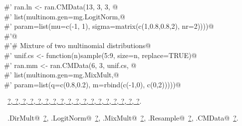 \documentclass[reqno]{amsart}
\renewcommand{\NWlink}[2]{\hyperlink{#1}{#2}}
\begin{document}
\begin{flushleft}
\begin{list}{}{}
\mbox{}\verb@#' ran.ln <- ran.CMData(13, 3, 3, @\\
\mbox{}\verb@#'                      list(multinom.gen=mg.LogitNorm,@\\
\mbox{}\verb@#'                           param=list(mu=c(-1, 1), sigma=matrix(c(1,0.8,0.8,2), nr=2))))@\\
\mbox{}\verb@#'@\\
\mbox{}\verb@#'# Mixture of two multinomial distributions@\\
\mbox{}\verb@#' unif.cs <- function(n){sample(5:9, size=n, replace=TRUE)}@\\
\mbox{}\verb@#' ran.mm <- ran.CMData(6, 3, unif.cs, @\\
\mbox{}\verb@#'                      list(multinom.gen=mg.MixMult,@\\
\mbox{}\verb@#'                           param=list(q=c(0.8,0.2), m=rbind(c(-1,0), c(0,2)))))@\\
\mbox{}\verb@@{\NWsep}
\end{list}
\vspace{-1.5ex}
\footnotesize
\begin{list}{}{\setlength{\itemsep}{-\parsep}\setlength{\itemindent}{-\leftmargin}}
\item \NWtxtFileDefBy\ \NWlink{nuweb?}{?}\NWlink{nuweb?}{, ?}\NWlink{nuweb?}{, ?}\NWlink{nuweb?}{, ?}\NWlink{nuweb?}{, ?}\NWlink{nuweb?}{, ?}\NWlink{nuweb?}{, ?}\NWlink{nuweb?}{, ?}\NWlink{nuweb?}{, ?}\NWlink{nuweb?}{, ?}\NWlink{nuweb?}{, ?}\NWlink{nuweb?}{, ?}\NWlink{nuweb?}{, ?}\NWlink{nuweb?}{, ?}\NWlink{nuweb?}{, ?}\NWlink{nuweb?}{, ?}\NWlink{nuweb?}{, ?}\NWlink{nuweb?}{, ?}.
\item \NWtxtIdentsUsed\nobreak\  \verb@mg.DirMult@\nobreak\ \NWlink{nuweb?}{?}, \verb@mg.LogitNorm@\nobreak\ \NWlink{nuweb?}{?}, \verb@mg.MixMult@\nobreak\ \NWlink{nuweb?}{?}, \verb@mg.Resample@\nobreak\ \NWlink{nuweb?}{?}, \verb@ran.CMData@\nobreak\ \NWlink{nuweb?}{?}.
\item{}
\end{list}
\vspace{4ex}
\end{flushleft}
\end{document}
